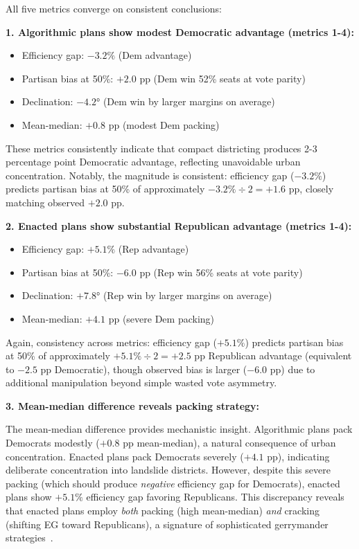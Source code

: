 All five metrics converge on consistent conclusions:

\textbf{1. Algorithmic plans show modest Democratic advantage (metrics 1-4):}
\begin{itemize}
    \item Efficiency gap: $-3.2\%$ (Dem advantage)
    \item Partisan bias at 50\%: $+2.0$ pp (Dem win 52\% seats at vote parity)
    \item Declination: $-4.2°$ (Dem win by larger margins on average)
    \item Mean-median: $+0.8$ pp (modest Dem packing)
\end{itemize}

These metrics consistently indicate that compact districting produces 2-3 percentage point Democratic advantage, reflecting unavoidable urban concentration. Notably, the magnitude is consistent: efficiency gap ($-3.2\%$) predicts partisan bias at 50\% of approximately $-3.2\% \div 2 = +1.6$ pp, closely matching observed $+2.0$ pp.

\textbf{2. Enacted plans show substantial Republican advantage (metrics 1-4):}
\begin{itemize}
    \item Efficiency gap: $+5.1\%$ (Rep advantage)
    \item Partisan bias at 50\%: $-6.0$ pp (Rep win 56\% seats at vote parity)
    \item Declination: $+7.8°$ (Rep win by larger margins on average)
    \item Mean-median: $+4.1$ pp (severe Dem packing)
\end{itemize}

Again, consistency across metrics: efficiency gap ($+5.1\%$) predicts partisan bias at 50\% of approximately $+5.1\% \div 2 = +2.5$ pp Republican advantage (equivalent to $-2.5$ pp Democratic), though observed bias is larger ($-6.0$ pp) due to additional manipulation beyond simple wasted vote asymmetry.

\textbf{3. Mean-median difference reveals packing strategy:}

The mean-median difference provides mechanistic insight. Algorithmic plans pack Democrats modestly ($+0.8$ pp mean-median), a natural consequence of urban concentration. Enacted plans pack Democrats severely ($+4.1$ pp), indicating deliberate concentration into landslide districts. However, despite this severe packing (which should produce \emph{negative} efficiency gap for Democrats), enacted plans show $+5.1\%$ efficiency gap favoring Republicans. This discrepancy reveals that enacted plans employ \emph{both} packing (high mean-median) \emph{and} cracking (shifting EG toward Republicans), a signature of sophisticated gerrymander strategies~\cite{stephanopoulos2015partisan}.


